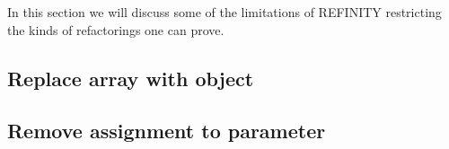 In this section we will discuss some of the limitations of REFINITY restricting the kinds of refactorings one can prove.

\subsection{Replace array with object}


\subsection{Remove assignment to parameter}

